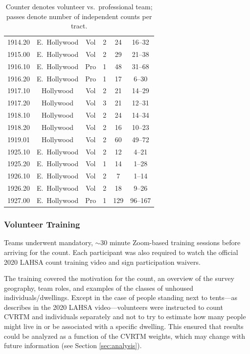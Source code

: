 \documentclass[11pt,twocolumn]{article}
\def\Count{count}
\begin{document}
\begin{table}[t!]
{\begin{tabular}{cccccc}
1914.20 & E.~Hollywood & Vol & 2 & 24 & 16--32 \\
1915.00 & E.~Hollywood & Vol & 2 & 29 & 21--38 \\
1916.10 & E.~Hollywood & Pro & 1 & 48 & 31--68 \\
1916.20 & E.~Hollywood & Pro & 1 & 17 & 6--30 \\
1917.10 & Hollywood & Vol & 2 & 21 & 14--29 \\
1917.20 & Hollywood & Vol & 3 & 21 & 12--31 \\
1918.10 & Hollywood & Vol & 2 & 24 & 14--34 \\
1918.20 & Hollywood & Vol & 2 & 16 & 10--23 \\
1919.01 & Hollywood & Vol & 2 & 60 & 49--72 \\
1925.10 & E.~Hollywood & Vol & 2 & 12 & 4--21 \\
1925.20 & E.~Hollywood & Vol & 1 & 14 & 1--28 \\
1926.10 & E.~Hollywood & Vol & 2 & 7 & 1--14 \\
1926.20 & E.~Hollywood & Vol & 2 & 18 & 9--26 \\
1927.00 & E.~Hollywood & Pro & 1 & 129 & 96--167
\\ \bottomrule
\end{tabular}
}
\caption*{Counter denotes volunteer vs.~professional team; passes denote number of
		independent counts per tract.}
\label{tbl:tractStats}
\end{table}

\subsubsection{Volunteer Training}
\label{sec:training}

Teams underwent mandatory, $\sim$30 minute Zoom-based training sessions before arriving 
for the \Count. Each participant was also required to watch the official 2020 LAHSA count training 
video and sign participation waivers.

The training covered the motivation for the \Count, an overview of the survey geography, team roles, 
and examples of the classes of unhoused individuals/dwellings. Except in the case of people standing 
next to tents---as describes in the 2020 LAHSA video---volunteers were instructed to count 
CVRTM and individuals separately and not to try to estimate how many people might live in or be 
associated with a specific dwelling. This ensured that results could be analyzed as a function of the 
CVRTM weights, which may change with future information (see Section \ref{sec:analysis}).
\end{document}

